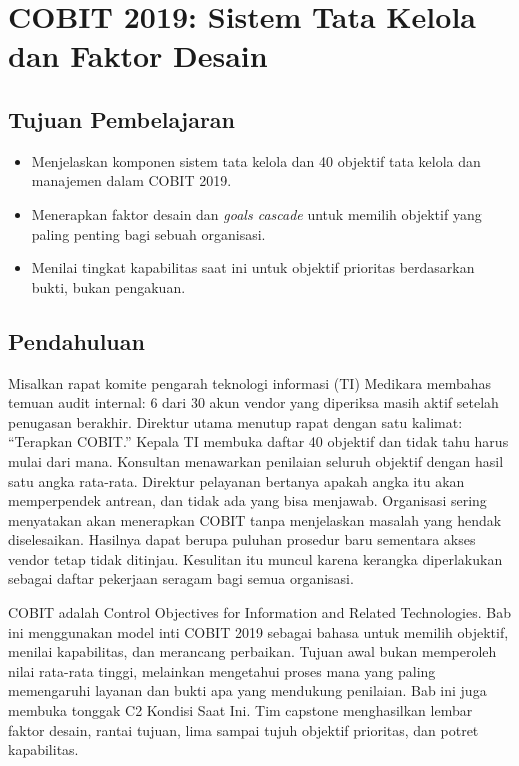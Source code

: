 \chapter{COBIT 2019: Sistem Tata Kelola dan Faktor Desain}

\section*{Tujuan Pembelajaran}
\begin{itemize}
  \item Menjelaskan komponen sistem tata kelola dan 40 objektif tata kelola dan
  manajemen dalam COBIT 2019.
  \item Menerapkan faktor desain dan \textit{goals cascade} untuk memilih objektif yang
  paling penting bagi sebuah organisasi.
  \item Menilai tingkat kapabilitas saat ini untuk objektif prioritas berdasarkan bukti,
  bukan pengakuan.
\end{itemize}

\section{Pendahuluan}

Misalkan rapat komite pengarah teknologi informasi (TI) Medikara membahas temuan audit
internal: 6 dari 30 akun vendor yang diperiksa masih aktif setelah penugasan berakhir.
Direktur utama menutup rapat dengan satu kalimat: ``Terapkan COBIT.'' Kepala TI membuka
daftar 40 objektif dan tidak tahu harus mulai dari mana. Konsultan menawarkan penilaian
seluruh objektif dengan hasil satu angka rata-rata. Direktur pelayanan bertanya apakah angka
itu akan memperpendek antrean, dan tidak ada yang bisa menjawab. Organisasi sering
menyatakan akan menerapkan COBIT tanpa menjelaskan masalah yang hendak diselesaikan.
Hasilnya dapat berupa puluhan prosedur baru sementara akses vendor tetap tidak ditinjau.
Kesulitan itu muncul karena kerangka diperlakukan sebagai daftar pekerjaan seragam bagi
semua organisasi.

COBIT adalah Control Objectives for Information and Related Technologies. Bab ini
menggunakan model inti COBIT 2019 sebagai bahasa untuk memilih objektif, menilai
kapabilitas, dan merancang perbaikan. Tujuan awal bukan memperoleh nilai rata-rata
tinggi, melainkan mengetahui proses mana yang paling memengaruhi layanan dan bukti apa
yang mendukung penilaian. Bab ini juga membuka tonggak C2 Kondisi Saat Ini. Tim capstone
menghasilkan lembar faktor desain, rantai tujuan, lima sampai tujuh objektif prioritas, dan
potret kapabilitas.

